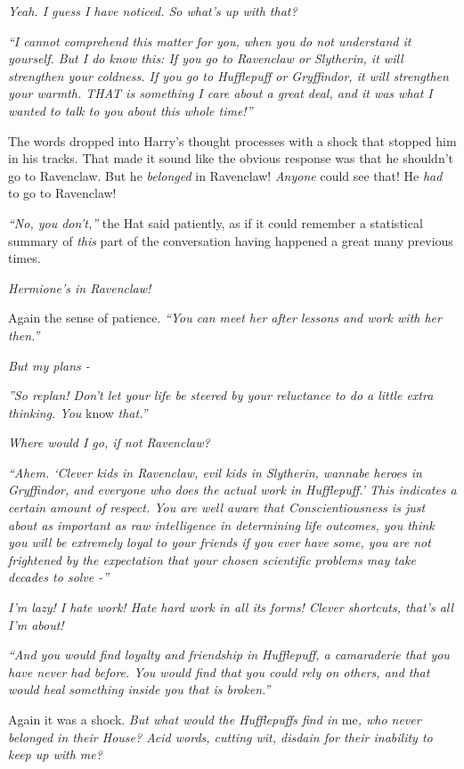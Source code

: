 \emph{Yeah. I guess I have noticed. So what's up with that?}

\emph{``I cannot comprehend this matter for you, when you do not
understand it yourself. But I do know this: If you go to Ravenclaw or
Slytherin, it will strengthen your coldness. If you go to Hufflepuff or
Gryffindor, it will strengthen your warmth. THAT is something I care
about a great deal, and it was what I wanted to talk to you about this
whole time!''}

The words dropped into Harry's thought processes with a shock that
stopped him in his tracks. That made it sound like the obvious response
was that he shouldn't go to Ravenclaw. But he \emph{belonged} in
Ravenclaw! \emph{Anyone} could see that! He \emph{had} to go to
Ravenclaw!

\emph{``No, you don't,''} the Hat said patiently, as if it could
remember a statistical summary of \emph{this} part of the conversation
having happened a great many previous times.

\emph{Hermione's in Ravenclaw!}

Again the sense of patience. \emph{``You can meet her after lessons and
work with her then.''}

\emph{But my plans -}

\emph{''So replan! Don't let your life be steered by your reluctance to
do a little extra thinking. You} know \emph{that.''}

\emph{Where would I go, if not Ravenclaw?}

\emph{``Ahem. `Clever kids in Ravenclaw, evil kids in Slytherin, wannabe
heroes in Gryffindor, and everyone who does the actual work in
Hufflepuff.' This indicates a certain amount of respect. You are well
aware that Conscientiousness is just about as important as raw
intelligence in determining life outcomes, you think you will be
extremely loyal to your friends if you ever have some, you are not
frightened by the expectation that your chosen scientific problems may
take decades to solve -''}

\emph{I'm lazy! I hate work! Hate hard work in all its forms! Clever
shortcuts, that's all I'm about!}

\emph{``And you would find loyalty and friendship in Hufflepuff, a
camaraderie that you have never had before. You would find that you
could rely on others, and that would heal something inside you that is
broken.''}

Again it was a shock. \emph{But what would the Hufflepuffs find in}
me\emph{, who never belonged in their House? Acid words, cutting wit,
disdain for their inability to keep up with me?}

